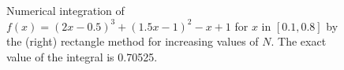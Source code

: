 \begin{figure}
\centering
{}
\caption{Numerical integration of $f(x) = (2 x-0.5)^3+(1.5 x-1)^2-x+1$ for $x$ in $[0.1,0.8]$
by the (right) rectangle method for increasing values of $N$. 
The exact value of the integral is 0.70525.}\label{fig:rectangle}
\end{figure}

